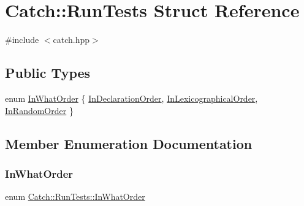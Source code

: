 \hypertarget{struct_catch_1_1_run_tests}{}\section{Catch\+::Run\+Tests Struct Reference}
\label{struct_catch_1_1_run_tests}


{\ttfamily \#include $<$catch.\+hpp$>$}

\subsection*{Public Types}
\begin{DoxyCompactItemize}
\item 
enum \mbox{\hyperlink{struct_catch_1_1_run_tests_ab56bd851b1dd085869992d1a9d73dc5d}{In\+What\+Order}} \{ \mbox{\hyperlink{struct_catch_1_1_run_tests_ab56bd851b1dd085869992d1a9d73dc5da732a98670b4661d80d8c392784a14f09}{In\+Declaration\+Order}}, 
\mbox{\hyperlink{struct_catch_1_1_run_tests_ab56bd851b1dd085869992d1a9d73dc5da8c62a42e94d867c708b421322b1c386f}{In\+Lexicographical\+Order}}, 
\mbox{\hyperlink{struct_catch_1_1_run_tests_ab56bd851b1dd085869992d1a9d73dc5da262441c5b5391b628ca6930c3ba028a5}{In\+Random\+Order}}
 \}
\end{DoxyCompactItemize}


\subsection{Member Enumeration Documentation}
\mbox{\label{struct_catch_1_1_run_tests_ab56bd851b1dd085869992d1a9d73dc5d}} 
\subsubsection{\texorpdfstring{InWhatOrder}{InWhatOrder}}
{\footnotesize\ttfamily enum \mbox{\hyperlink{struct_catch_1_1_run_tests_ab56bd851b1dd085869992d1a9d73dc5d}{Catch\+::\+Run\+Tests\+::\+In\+What\+Order}}}

